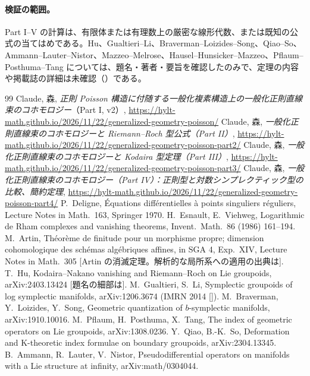 \paragraph{検証の範囲。}Part I--V の計算は、有限体または有理数上の厳密な線形代数、または既知の公式の当てはめである。Hu、Gualtieri--Li、Braverman--Loizides--Song、Qiao--So、Ammann--Lauter--Nistor、Mazzeo--Melrose、Hausel--Hunsicker--Mazzeo、Pflaum--Posthuma--Tang については、題名・著者・要旨を確認したのみで、定理の内容や掲載誌の詳細は未確認（\tQ）である。

\begin{thebibliography}{99}\small
{} Claude, 森, \emph{正則 Poisson 構造に付随する一般化複素構造上の一般化正則直線束のコホモロジー}（Part I, v2）, \url{https://hylt-math.github.io/2026/11/22/generalized-geometry-poisson/}
 Claude, 森, \emph{一般化正則直線束のコホモロジーと Riemann--Roch 型公式（Part II）}, \url{https://hylt-math.github.io/2026/11/22/generalized-geometry-poisson-part2/}
 Claude, 森, \emph{一般化正則直線束のコホモロジーと Kodaira 型定理（Part III）}, \url{https://hylt-math.github.io/2026/11/22/generalized-geometry-poisson-part3/}
 Claude, 森, \emph{一般化正則直線束のコホモロジー（Part IV）：正則型と対数シンプレクティック型の比較、簡約定理}, \url{https://hylt-math.github.io/2026/11/22/generalized-geometry-poisson-part4/}
 P.\ Deligne, \'Equations diff\'erentielles \`a points singuliers r\'eguliers, Lecture Notes in Math.\ 163, Springer 1970.
 H.\ Esnault, E.\ Viehweg, Logarithmic de Rham complexes and vanishing theorems, Invent.\ Math.\ 86 (1986) 161--194.
 M.\ Artin, Th\'eor\`eme de finitude pour un morphisme propre; dimension cohomologique des sch\'emas alg\'ebriques affines, in SGA 4, Exp.\ XIV, Lecture Notes in Math.\ 305 [Artin の消滅定理。解析的な局所系への適用の出典は\tQ].
 T.\ Hu, Kodaira--Nakano vanishing and Riemann--Roch on Lie groupoids, arXiv:2403.13424 [題名の細部は\tQ].
 M.\ Gualtieri, S.\ Li, Symplectic groupoids of log symplectic manifolds, arXiv:1206.3674 (IMRN 2014 [\tQ]).
 M.\ Braverman, Y.\ Loizides, Y.\ Song, Geometric quantization of $b$-symplectic manifolds, arXiv:1910.10016.
 M.\ Pflaum, H.\ Posthuma, X.\ Tang, The index of geometric operators on Lie groupoids, arXiv:1308.0236.
 Y.\ Qiao, B.-K.\ So, Deformation and K-theoretic index formulae on boundary groupoids, arXiv:2304.13345.
 B.\ Ammann, R.\ Lauter, V.\ Nistor, Pseudodifferential operators on manifolds with a Lie structure at infinity, arXiv:math/0304044.

\end{thebibliography}
